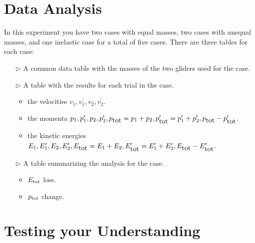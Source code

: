 \section{Data Analysis}

In this experiment you have two cases with equal masses, two cases with unequal masses, and one inelastic case for a total of five cases. There are three tables for each case:
\begin{itemize}
\item[$\triangleright$] A common data table with the masses of the two gliders used for the case.
\item[$\triangleright$] A table with the results for each trial in the case.
  \begin{itemize}
  \item the velocities $v_1, v_1^\prime, v_2, v_2^\prime $.
  \item the momenta $p_1, p_1^\prime, p_2, p_2^\prime, p_{\mbox{\mbox{tot}}}=p_1 + p_2, p_{\mbox{\mbox{tot}}}^\prime=p_1^\prime + p_2^\prime, p_{\mbox{\mbox{tot}}}-p_{\mbox{\mbox{tot}}}^\prime$.
  \item the kinetic energies $E_1, E_1^\prime, E_2, E_2^\prime, E_{\mbox{\mbox{tot}}}=E_1 + E_2, E_{\mbox{\mbox{tot}}}^\prime=E_1^\prime + E_2^\prime,E_{\mbox{\mbox{tot}}}-E_{\mbox{\mbox{tot}}}^\prime$.
  \end{itemize}
\item[$\triangleright$] A table summarizing the analysis for the case.
  \begin{itemize}
  \item $E_{\rm tot }$ loss.
  \item $p_{\rm tot }$ change.
  \end{itemize}
\end{itemize}

\section{Testing your Understanding}

